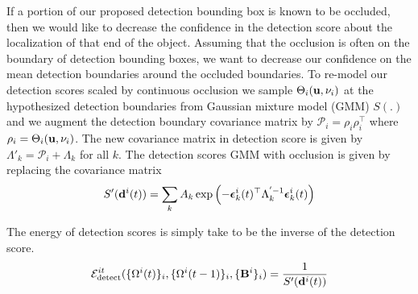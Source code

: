 If a portion of our proposed detection bounding box is known to be
occluded, then we would like to decrease the confidence in the detection score
about the localization of that end of the object. Assuming that the occlusion
is often on the boundary of detection bounding boxes, we want to decrease our
confidence on the mean detection boundaries around the occluded boundaries.
To re-model our detection scores scaled by continuous occlusion we sample
$\Theta_{i}(\mathbf{u}, \nu_i)$ at the hypothesized detection boundaries from
Gaussian mixture model (GMM) $S(.)$ and we augment the detection boundary covariance matrix by
$\mathcal{P}_{i} = \rho_{i}\rho_{i}^\top$ where $\rho_{i} = \Theta_{i}(\mathbf{u},
\nu_i)$. The new covariance matrix in detection score is given by 
  $\Lambda'_k = \mathcal{P}_{i} + \Lambda_k$ for all $k$.
The detection scores GMM with occlusion is given by replacing the covariance
matrix
%
\begin{multline}
S'(\mathbf{d}^{i}(t)) = \sum_k A_k \exp \left( -{\bm{\epsilon}}_k^{i}(t)^\top \Lambda_k^{'-1} {\bm{\epsilon}}_k^{i}(t) \right)
\end{multline}

The energy of detection scores is simply take to be the inverse of the detection score.
\begin{align}
  \mathcal{E}^{it}_{\text{detect}}(\{ \Omega^{i}(t) \}_i, \{ \Omega^{i}(t-1) \}_i, \{\mathbf{B}^{i}\}_i ) = \frac{1}{S'(\mathbf{d}^{i}(t))}
\end{align}

